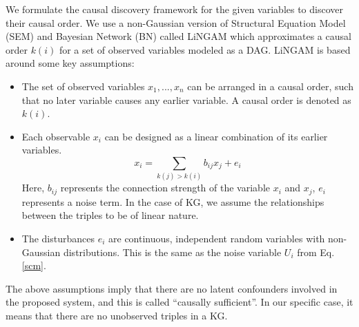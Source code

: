 \documentclass{article}
\begin{document}
We formulate the causal discovery framework for the given variables to discover their causal order. We use a non-Gaussian version of Structural Equation Model (SEM) and Bayesian Network (BN) called LiNGAM which approximates a causal order $k(i)$ for a set of observed variables modeled as a DAG. LiNGAM is based around some key assumptions:
\begin{itemize}
\item The set of observed variables ${x_1,...,x_n}$ can be arranged in a causal order, such that no later variable causes any earlier variable. A causal order is denoted as $k(i)$.

\item Each observable $x_i$ can be designed as a linear combination of its earlier variables. 
\begin{equation}
\label{lingam}
    x_i = \sum_{k(j)>k(i)} b_{ij}x_j + e_i
\end{equation}
Here, $b_{ij}$ represents the connection strength of the variable $x_i$ and $x_j$, $e_i$ represents a noise term. In the case of KG, we assume the relationships between the triples to be of linear nature.

\item The disturbances $e_i$ are continuous, independent random variables with non-Gaussian distributions. This is the same as the noise variable $U_i$ from Eq. \ref{scm}.

\end{itemize}

The above assumptions imply that there are no latent confounders involved in the proposed system, and this is called “causally sufficient”. In our specific case, it means that there are no unobserved triples in a KG. 
\end{document}
